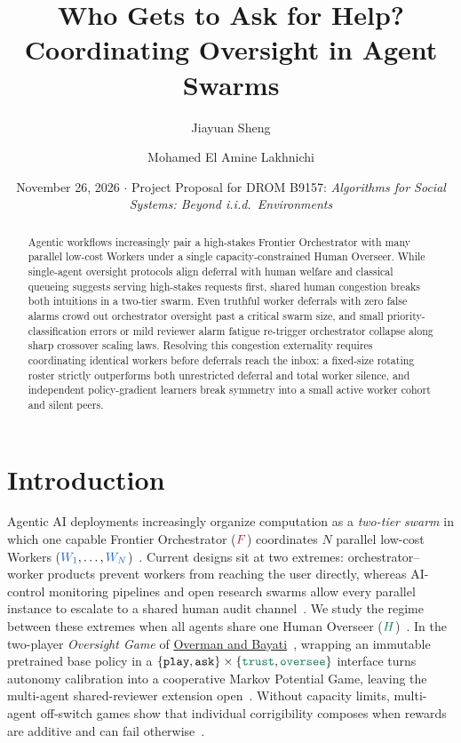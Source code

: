 \documentclass[11pt,reqno]{amsart}
\title[Who Gets to Ask for Help?]{Who Gets to Ask for Help?\\Coordinating \texorpdfstring{\Htxt{Human}}{Human} Oversight in Agent Swarms}
\author{Jiayuan Sheng}
\author{Mohamed El Amine Lakhnichi}
\date{November 26, 2026 \quad $\cdot$ \quad Project Proposal for DROM B9157: \emph{Algorithms for Social Systems: Beyond i.i.d.\ Environments}}
\theoremstyle{spacious}
\newcommand{\Wtxt}[1]{\textcolor{colW}{#1}}
\newcommand{\Ftxt}[1]{\textcolor{colF}{#1}}
\newcommand{\Htxt}[1]{\textcolor{colH}{#1}}
\newcommand{\Wv}[1]{{\color{colW}#1}}
\newcommand{\Fv}[1]{{\color{colF}#1}}
\newcommand{\Hv}[1]{{\color{colH}#1}}
\newcommand{\ask}{\mathtt{ask}}
\newcommand{\play}{\mathtt{play}}
\newcommand{\oversee}{{\color{colH}\mathtt{oversee}}}
\newcommand{\trust}{{\color{colH}\mathtt{trust}}}
\begin{document}
\begin{abstract}
Agentic workflows increasingly pair a high-stakes \Ftxt{Frontier Orchestrator} with many parallel low-cost \Wtxt{Workers} under a single capacity-constrained \Htxt{Human Overseer}. While single-agent oversight protocols align deferral with \Htxt{human} welfare and classical queueing suggests serving high-stakes requests first, shared \Htxt{human} congestion breaks both intuitions in a two-tier swarm. Even truthful \Wtxt{worker} deferrals with zero false alarms crowd out \Ftxt{orchestrator} oversight past a critical swarm size, and small priority-classification errors or mild \Htxt{reviewer} alarm fatigue re-trigger \Ftxt{orchestrator} collapse along sharp crossover scaling laws. Resolving this congestion externality requires coordinating identical \Wtxt{workers} before deferrals reach the inbox: a fixed-size rotating roster strictly outperforms both unrestricted deferral and total \Wtxt{worker} silence, and independent policy-gradient learners break symmetry into a small active \Wtxt{worker} cohort and silent peers.
\end{abstract}

\maketitle

\section{Introduction}
\label{sec:intro}

Agentic AI deployments increasingly organize computation as a \emph{two-tier swarm} in which one capable \Ftxt{Frontier Orchestrator} ($\Fv{F}$) coordinates $N$ parallel low-cost \Wtxt{Workers} ($\Wv{W_1},\dots,\Wv{W_N}$)~\cite{anthropic2025research,kimi2026k25}. Current designs sit at two extremes: orchestrator--worker products prevent \Wtxt{workers} from reaching the user directly, whereas AI-control monitoring pipelines and open research swarms allow every parallel instance to escalate to a shared \Htxt{human} audit channel~\cite{greenblatt2024control,lindner2025control,paglieri2026swarm}. We study the regime between these extremes when all agents share one \Htxt{Human Overseer} ($\Hv{H}$)~\cite{wang2026ask,lindner2025control}. In the two-player \emph{Oversight Game} of \href{https://arxiv.org/abs/2510.26752}{Overman and Bayati}~\cite{overman2026oversight}, wrapping an immutable pretrained base policy in a $\{\play,\ask\}\times\{\trust,\oversee\}$ interface turns autonomy calibration into a cooperative Markov Potential Game, leaving the multi-agent shared-\Htxt{reviewer} extension open~\cite{overman2026oversight,turan2026capacity}. Without capacity limits, multi-agent off-switch games show that individual corrigibility composes when rewards are additive and can fail otherwise~\cite{agrawal2026offswitch}.
\end{document}
